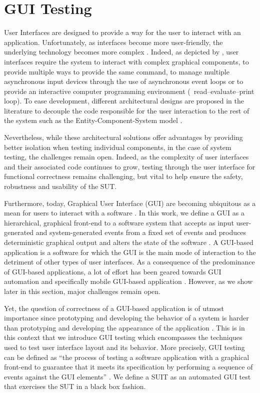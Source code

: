 \section{GUI Testing}
\label{sec:introduction-gui-testing}

User Interfaces are designed to provide a way for the user to interact with an application. Unfortunately, as interfaces become more user-friendly, the underlying technology becomes more complex \cite{Myers1994}. Indeed, as depicted by \textcite{Myers1995}, user interfaces require the system to  interact with complex graphical components, to provide multiple ways to provide the same command, to manage multiple asynchronous input devices through the use of asynchronous event loops or to provide an interactive computer programming environment (\eg\ read–evaluate–print loop). To ease development, different architectural designs are proposed in the literature to decouple the code responsible for the user interaction to the rest of the system such as the Entity-Component-System model \cite{Raffaillac2018}.

Nevertheless, while these architectural solutions offer advantages by providing better isolation when testing individual components, in the case of system testing, the challenges remain open. Indeed, as the complexity of user interfaces and their associated code continues to grow, testing through the user interface for functional correctness remains challenging, but vital to help ensure the safety, robustness and usability of the SUT.

Furthermore, today, Graphical User Interface (GUI) are becoming ubiquitous as a mean for users to interact with a software \cite{Myers1992, Myers1995, Brooks2009, Memon2010}. In this work, we define a GUI as a hierarchical, graphical front-end to a software system that accepts as input user-generated and system-generated events from a fixed set of events and produces deterministic graphical output \cite{Memon2007} and alters the state of the software \cite{Nguyen2014}. A GUI-based application is a software for which the GUI is the main mode of interaction to the detriment of other types of user interfaces. As a consequence of the predominance of GUI-based applications, a lot of effort has been geared towards GUI automation and specifically mobile GUI-based application \cite{Machiry2013, Gomez2013}. However, as we show later in this section, major challenges remain open.

Yet, the question of correctness of a GUI-based application is of utmost importance since prototyping and developing the behavior of a system is harder than prototyping and developing the appearance of the application \cite{Myers2008}. This is in this context that we introduce GUI testing which encompasses the techniques used to test user interface layout and its behavior. More precisely, GUI testing can be defined as ``the process of testing a software application with a graphical front-end to guarantee that it meets its specification by performing a sequence of events against the GUI elements'' \cite{Cunha2010, Banerjee2013, Issa2012}. We define a SUIT as an automated GUI test that exercises the SUT in a black box fashion.

